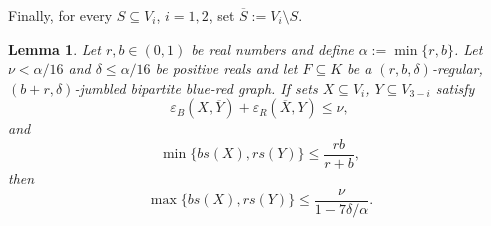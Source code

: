 \documentclass[12pt,reqno]{amsart}
\newcommand{\eps} {\varepsilon}
\newtheorem{lemma}[theorem]{Lemma}
\theoremstyle{definition}
\newcommand{\eb}{\eps_{B}}
\newcommand{\er}{\eps_{R}}
\newcommand{\x}{\rs{\sx}}
\newcommand{\y}{\rs{\sy}}
\newcommand{\sx}{X}
\newcommand{\sy}{Y}
\newcommand{\rs}[1]{s(#1)}
\begin{document}
Finally, for every $S\subseteq V_i$, $i = 1,2$,  set $\overline{S}:=V_i\setminus S$.

\begin{lemma}
	\label{lem_ananas_prep}
	Let $r, b \in (0,1)$ be real numbers and define $\alpha := \min \{r,b\}$.
	Let $\nu<\alpha/16$ and $\delta \leq \alpha/16$ be positive reals and
	let $F \subseteq K$ be a $(r, b, \delta)$-regular, $(b + r, \delta)$-jumbled bipartite blue-red graph. If sets $X \subseteq V_i$, $Y \subseteq V_{3-i}$ satisfy
\begin{equation}
  \label{eq_small_cross}
	\eb(X,\overline{Y}) + \er(\overline{X},Y) \le \nu,
\end{equation}
and
\begin{equation}
  \label{eq_less_one}
	\min \{b\x,r\y\} \leq \frac{rb}{r + b},
\end{equation}
then
\begin{equation}
	\label{eq_one_smaller}
	\max \{b\x, r\y\} \le \frac{\nu}{1 - 7\delta/\alpha}.
\end{equation}
\end{lemma}
\end{document}
